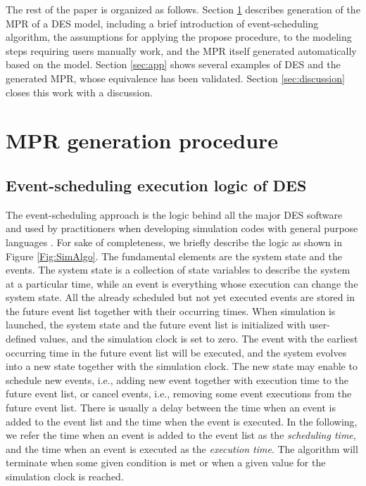 \documentclass[]{interact}
\theoremstyle{plain}%
\theoremstyle{definition}
\theoremstyle{remark}
\begin{document}
The rest of the paper is organized as follows. Section \ref{sec:MPR} describes generation of the MPR of a DES model, including a brief introduction of event-scheduling algorithm, the assumptions for applying the propose procedure, to the modeling steps requiring users manually work, and the MPR itself generated automatically based on the model. Section \ref{sec:app} shows several examples of DES and the generated MPR, whose equivalence has been validated. Section \ref{sec:discussion} closes this work with a discussion. 

\section{MPR generation procedure} \label{sec:MPR}
\subsection{Event-scheduling execution logic of DES } \label{sec:SimAlgo}

The event-scheduling approach is the logic behind all the major DES software and used by practitioners when developing simulation codes with general purpose languages \citep{law2014simulation}. For sake of completeness, we briefly describe the logic as shown in Figure \ref{Fig:SimAlgo}. The fundamental elements are the system state and the events. The system state is a collection of state variables to describe the system at a particular time, while an event is everything whose execution can change the system state. %
All the already scheduled but not yet executed events are stored in the future event list together with their occurring times. %
When simulation is launched, the system state and the future event list is initialized with user-defined values, and the simulation clock is set to zero. The event with the earliest occurring time in the future event list will be executed, and the system evolves into a new state together with the simulation clock. The new state may enable to schedule new events, i.e., adding new event together with execution time to the future event list, or cancel events, i.e., removing some event executions from the future event list. There is usually a delay between the time when an event is added to the event list and the time when the event is executed. %
In the following, we refer the time when an event is added to the event list as the \textit{scheduling time}, and the time when an event is executed as the \textit{execution time}. The algorithm will terminate when some given condition is met or when a given value for the simulation clock is reached.
\end{document}
